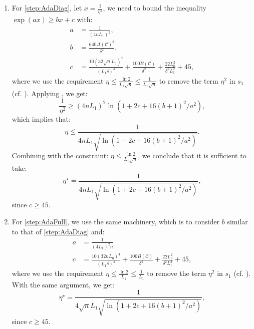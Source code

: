 \documentclass{article}
\theoremstyle{plain}
\theoremstyle{definition}
\theoremstyle{remark}
\newcommand*{\cC}{\mathcal{C}}
\begin{document}
\begin{enumerate}[leftmargin=*]
    \item For \ref{step:AdaDiag}, let $x = \frac{1}{\eta^2}$, we need to bound the inequality $\exp(ax) \geq bx + c$ with:
    \begin{equation*}
        \begin{aligned}
            a &= \frac{1}{(4nL_1)^2},\\
            b &= \frac{640\Delta(\cC)^2}{\delta^2},\\
            c &= \frac{10(32\sqrt{n} L_0)^4}{(L_1\delta)^4} + \frac{100 B(\cC)}{\delta^2} + \frac{22L_0^2}{\delta^2L_1^2} + 45,
        \end{aligned}
    \end{equation*}
    where we use the requirement $\eta \leq \frac{\ln 2}{L_1\sqrt{n}} \leq \frac{1}{L_1\sqrt{n}}$ to remove the term $\eta^2$ in $s_1$ (cf. ).
    Applying , we get:
    \begin{equation*}
        \frac{1}{\eta^2} \geq (4nL_1)^2 \ln (1 + 2c + 16(b+1)^2/a^2),
    \end{equation*}
    which implies that:
    \begin{equation*}
        \eta \leq \frac{1}{4nL_1\sqrt{\ln(1 + 2c + 16(b+1)^2/a^2)}}.
    \end{equation*}
    Combining with the constraint: $\eta \leq \frac{\ln 2}{L_1\sqrt{n}}$, we conclude that it is sufficient to take:
    \begin{equation*}
        \eta^\star = \frac{1}{4nL_1 \sqrt{\ln(1 + 2c + 16(b+1)^2/a^2)}},
    \end{equation*}
    since $c \geq 45$.
    \item For \ref{step:AdaFull}, we use the same machinery, which is to consider $b$ similar to that of \ref{step:AdaDiag} and:
    \begin{equation*}
        \begin{aligned}
            a &= \frac{1}{(4L_1)^2 n}\\
            c &= \frac{10(32{n} L_0)^4}{(L_1\delta)^4} + \frac{100 B(\cC)}{\delta^2} + \frac{22L_0^2}{\delta^2L_1^2} + 45, 
        \end{aligned}
    \end{equation*}
    where we use the requirement $\eta \leq \frac{\ln 2}{L_1} \leq \frac{1}{L_1}$ to remove the term $\eta^2$ in $s_1$ (cf. ).
    With the same argument, we get:
    \begin{equation*}
        \eta^\star = \frac{1}{4\sqrt{n}L_1\sqrt{\ln(1 + 2c + 16(b+1)^2/a^2)}},
    \end{equation*}
    since $c \geq 45$.
\end{enumerate}
\end{document}
